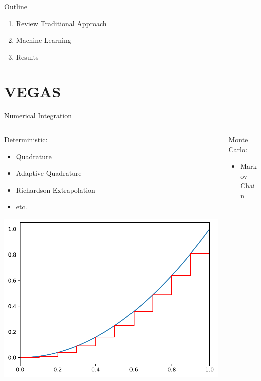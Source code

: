 \documentclass{beamer}
\begin{document}
\begin{frame}{Outline}
\begin{enumerate}
    \item Review Traditional Approach
    \item Machine Learning
    \item Results
\end{enumerate}
    
\end{frame}

\section{VEGAS}

\begin{frame}{Numerical Integration}
    \begin{columns}
        \begin{column}{5cm}
        Deterministic:
        \begin{itemize}
            \item Quadrature
            \item Adaptive Quadrature
            \item Richardson Extrapolation
            \item etc.
        \end{itemize}
        \includegraphics[width=\textwidth]{figs/midpoint.pdf}
        \end{column}
        \begin{column}{5cm}
        Monte Carlo:
        \begin{itemize}
            \item Markov-Chain

\end{itemize}
\end{column}
\end{columns}
\end{frame}
\end{document}
